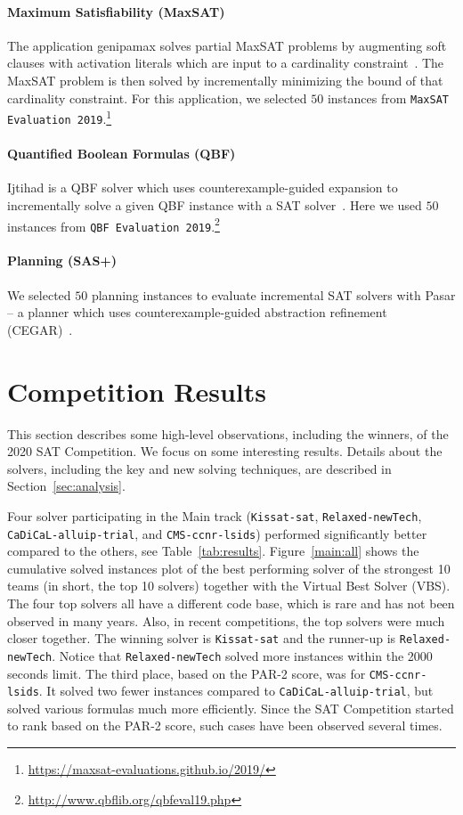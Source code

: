 \documentclass{elsarticle}
\newcommand{\solver}[1]{\texttt{#1}}
\begin{document}
\paragraph{Maximum Satisfiability (MaxSAT)}

The application \textsf{genipamax} solves partial MaxSAT problems by augmenting soft clauses with activation literals which are input to a cardinality constraint~\cite{Philipp:2015:PBLib}. 
The MaxSAT problem is then solved by incrementally minimizing the bound of that cardinality constraint. 
For this application, we selected $50$ instances from \texttt{MaxSAT Evaluation 2019}.\footnote{\url{https://maxsat-evaluations.github.io/2019/}}

\paragraph{Quantified Boolean Formulas (QBF)}
\textsf{Ijtihad} is a QBF solver which uses counter\-example-guided expansion to incrementally solve a given QBF instance with a SAT solver~\cite{Bloem:2018:QBFSAT}. 
Here we used $50$ instances from \texttt{QBF Evaluation 2019}.\footnote{\url{http://www.qbflib.org/qbfeval19.php}}

\paragraph{Planning (SAS+)}
We selected $50$ planning instances to evaluate incremental SAT solvers with \textsf{Pasar} -- a planner which uses counter\-example-guided abstraction refinement (CEGAR)~\cite{Froleyks:2019:Pasar}. 


\section{Competition Results}
\label{sec:results}

This section describes some high-level observations, including the winners, of the 2020 SAT Competition. 
We focus on some interesting results. Details about the solvers, including the key and new solving techniques,
are described in Section~\ref{sec:analysis}.

Four solver participating in the Main track (\solver{Kissat-sat}, \solver{Relaxed-newTech}, \solver{CaDiCaL-alluip-trial}, and \solver{CMS-ccnr-lsids}) 
performed significantly better compared to the others, see Table~\ref{tab:results}.
Figure~\ref{main:all} shows the cumulative solved instances plot of the best performing solver of the strongest
10 teams (in short, the top 10 solvers)  together with the Virtual Best Solver (VBS).
The four top solvers all have a different code base, which is rare and has not been observed in many years.
Also, in recent competitions, the top solvers were much closer together.
The winning solver is \solver{Kissat-sat} and the runner-up is \solver{Relaxed-newTech}. Notice that 
\solver{Relaxed-newTech} solved more instances within the 2000 seconds limit.
The third place, based on the PAR-2 score, was for \solver{CMS-ccnr-lsids}. It solved two fewer instances
compared to \solver{CaDiCaL-alluip-trial}, but solved various formulas much more efficiently. 
Since the SAT Competition started to rank based on the PAR-2 score, such cases have been observed several times. 
\end{document}
